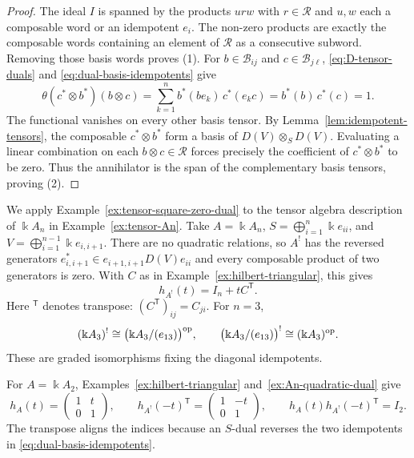 \begin{proof}
The ideal $I$ is spanned by the products $urw$ with $r\in\mathcal R$ and $u,w$ each a composable word or an idempotent $e_i$.
The non-zero products are exactly the composable words containing an element of $\mathcal R$ as a consecutive subword.
Removing those basis words proves (1).
For $b\in\mathcal B_{ij}$ and $c\in\mathcal B_{j\ell}$, \eqref{eq:D-tensor-duals} and \eqref{eq:dual-basis-idempotents} give
\[
\theta(c^*\otimes b^*)(b\otimes c)=\sum_{k=1}^n b^*(be_k)\,c^*(e_kc)=b^*(b)\,c^*(c)=1.
\]
The functional vanishes on every other basis tensor.
By Lemma~\ref{lem:idempotent-tensors}, the composable $c^*\otimes b^*$ form a basis of $D(V)\otimes_S D(V)$.
Evaluating a linear combination on each $b\otimes c\in\mathcal R$ forces precisely the coefficient of $c^*\otimes b^*$ to be zero.
Thus the annihilator is the span of the complementary basis tensors, proving (2).
\end{proof}

\begin{example}\label{ex:An-quadratic-dual}
We apply Example~\ref{ex:tensor-square-zero-dual} to the tensor algebra description of $\Bbbk A_n$ in Example~\ref{ex:tensor-An}.
Take $A=\Bbbk A_n$, $S=\bigoplus_{i=1}^n\Bbbk e_{ii}$, and $V=\bigoplus_{i=1}^{n-1}\Bbbk e_{i,i+1}$.
There are no quadratic relations, so $A^!$ has the reversed generators $e_{i,i+1}^*\in e_{i+1,i+1}D(V)e_{ii}$ and every composable product of two generators is zero.
With $C$ as in Example~\ref{ex:hilbert-triangular}, this gives
\[
h_{A^!}(t)=I_n+tC^{\mathsf T}.
\]
Here ${}^{\mathsf T}$ denotes transpose: $(C^{\mathsf T})_{ij}=C_{ji}$.
For $n=3$,
\[
(\Bbbk A_3)^!\cong\bigl(\Bbbk A_3/(e_{13})\bigr)^{\mathrm{op}},
\qquad
\bigl(\Bbbk A_3/(e_{13})\bigr)^!\cong(\Bbbk A_3)^{\mathrm{op}}.
\]
These are graded isomorphisms fixing the diagonal idempotents.
\end{example}

\begin{example}\label{ex:hilbert-dual-An}
For $A=\Bbbk A_2$, Examples~\ref{ex:hilbert-triangular} and~\ref{ex:An-quadratic-dual} give
\[
h_A(t)=\begin{pmatrix}1&t\\0&1\end{pmatrix},\qquad
h_{A^!}(-t)^{\mathsf T}=\begin{pmatrix}1&-t\\0&1\end{pmatrix},\qquad
h_A(t)h_{A^!}(-t)^{\mathsf T}=I_2.
\]
The transpose aligns the indices because an $S$-dual reverses the two idempotents in \eqref{eq:dual-basis-idempotents}.
\end{example}
                   

